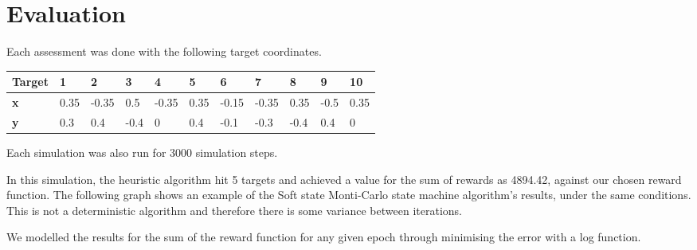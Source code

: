 \section{Evaluation}
Each assessment was done with the following target coordinates.

\begin{table}[]
    \begin{tabular}{|l|l|l|l|l|l|l|l|l|l|l|}
    \hline
    \textbf{Target} & \textbf{1} & \textbf{2} & \textbf{3} & \textbf{4} & \textbf{5} & \textbf{6} & \textbf{7} & \textbf{8} & \textbf{9} & \textbf{10} \\ \hline
    \textbf{x}      & 0.35       & -0.35      & 0.5        & -0.35      & 0.35       & -0.15      & -0.35      & 0.35       & -0.5       & 0.35        \\ \hline
    \textbf{y}      & 0.3        & 0.4        & -0.4       & 0          & 0.4        & -0.1       & -0.3       & -0.4       & 0.4        & 0           \\ \hline
    \end{tabular}
\end{table}

Each simulation was also run for 3000 simulation steps.

In this simulation, the heuristic algorithm hit 5 targets and achieved a value for the sum of rewards as 4894.42, against our chosen reward function.
The following graph shows an example of the Soft state Monti-Carlo state machine algorithm’s results, under the same conditions. This is not a deterministic algorithm and therefore there is some variance  between iterations.

We modelled the results for the sum of the reward function for any given epoch through minimising the error with a log function.

